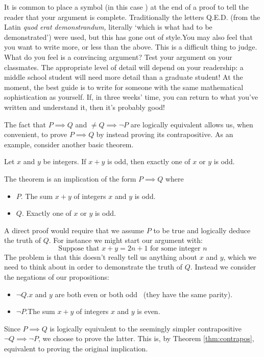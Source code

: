  It is common to place a symbol (in this case \smash{\raisebox{7pt}{$\qedsymbol$}}) at the end of a proof to tell the reader that your argument is complete. Traditionally the letters Q.E.D. (from the Latin \emph{quod erat demonstrandum,} literally `which is what had to be demonstrated') were used, but this has gone out of style.You may also feel that you want to write more, or less than the above. This is a difficult thing to judge. What do you feel is a convincing argument? Test your argument on your classmates. The appropriate level of detail will depend on your readership: a middle school student will need more detail than a graduate student! At the moment, the best guide is to write for someone with the same mathematical sophistication as yourself. If, in three weeks' time, you can return to what you've written and understand it, then it's probably good!






The fact that $P\implies Q$ and $\neq Q\implies\neg P$ are logically equivalent allows us, when convenient, to prove $P\implies Q$ by instead proving its contrapositive. As an example, consider another basic theorem.

\begin{thm}{}{}
Let $x$ and $y$ be integers. If $x+y$ is odd, then exactly one of $x$ or $y$ is odd.
\end{thm}

 The theorem is an implication of the form $P\implies Q$ where
\begin{itemize}\setlength{\itemsep}{0pt}
  \item[]$P$. The sum $x+y$ of integers $x$ and $y$ is odd.
  \item[]$Q$. Exactly one of $x$ or $y$ is odd.
\end{itemize}

 A direct proof would require that we assume $P$ to be true and logically deduce the truth of $Q$. For instance we might start our argument with:
\[\text{Suppose that $x+y=2n+1$ for some integer $n$}\]
The problem is that this doesn't really tell us anything about $x$ and $y$, which we need to think about in order to demonstrate the truth of $Q$. Instead we consider the negations of our propositions:
\begin{itemize}\setlength{\itemsep}{0pt}
  \item[]$\neg Q$.\quad $x$ and $y$ are both even or both odd \ (they have the same parity).
  \item[]$\neg P$.\quad The sum $x+y$ of integers $x$ and $y$ is even.
\end{itemize}
Since $P\implies Q$ is logically equivalent to the seemingly simpler contrapositive $\neg Q\implies\neg P$, we choose to prove the latter. This is, by Theorem \ref{thm:contrapos}, equivalent to proving the original implication.

